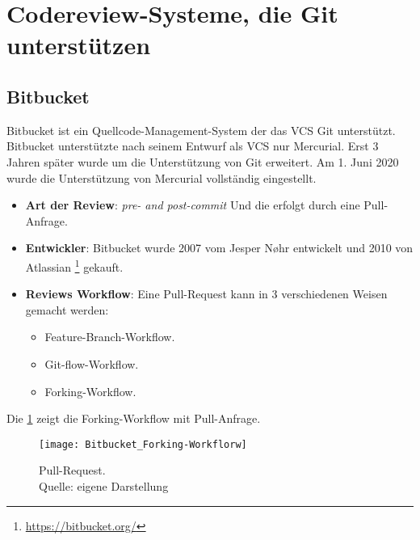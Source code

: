 
\section{Codereview-Systeme, die Git unterstützen}
\label{sec:CRS-Git}

\subsection{Bitbucket}
\label{subsec:Bitbucket}

Bitbucket ist ein Quellcode-Management-System der das \ac{VCS} Git unterstützt. Bitbucket unterstützte nach seinem Entwurf als \ac{VCS} nur Mercurial. Erst 3 Jahren später wurde um die Unterstützung von Git erweitert. Am 1. Juni 2020 wurde die Unterstützung von Mercurial vollständig eingestellt.

\begin{itemize}
	\item \textbf{Art der Review}: \textit{pre- and post-commit} Und die erfolgt durch eine Pull-Anfrage.
	\item \textbf{Entwickler}: Bitbucket wurde 2007 vom Jesper Nøhr entwickelt und 2010 von Atlassian \footnote{\url{https://bitbucket.org/}}
		 gekauft. 
	\item \textbf{Reviews Workflow}: Eine Pull-Request kann in 3 verschiedenen Weisen gemacht werden:
		\begin{itemize}
			\item Feature-Branch-Workflow.
			\item Git-flow-Workflow.
			\item Forking-Workflow.
		\end{itemize}
\end{itemize}

Die \cref{fig:Forking-workflow} zeigt die Forking-Workflow mit Pull-Anfrage.

\begin{figure}[H]
	\centering
	\texttt{[image: Bitbucket\_Forking-Workflorw]}
	\caption[Bitbuckets Ablauf]{Pull-Request.\\ Quelle: eigene Darstellung}
	\label{fig:Forking-workflow}
\end{figure}		  

